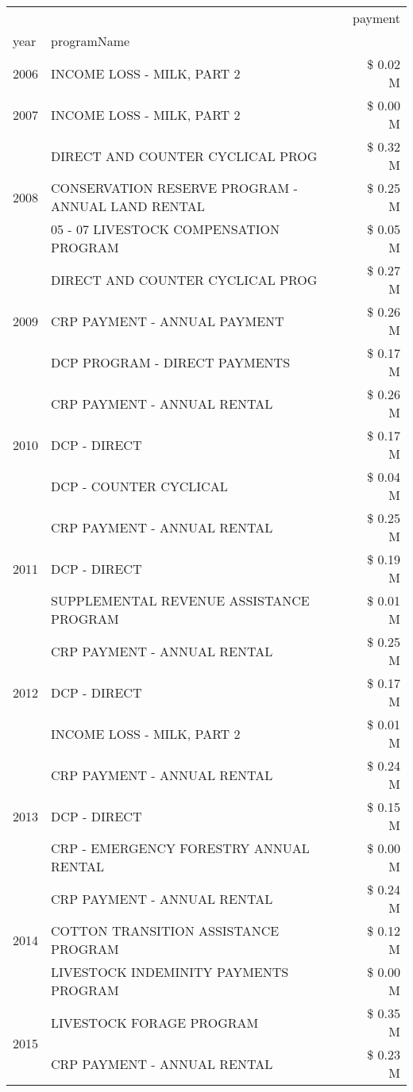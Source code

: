 \begin{tabular}{llr}
\toprule
 &  & payment \\
year & programName &  \\
\midrule
2006 & INCOME LOSS - MILK, PART 2 & \$ 0.02 M \\
\cline{1-3}
2007 & INCOME LOSS - MILK, PART 2 & \$ 0.00 M \\
\cline{1-3}
\multirow[t]{3}{*}{2008} & DIRECT AND COUNTER CYCLICAL PROG & \$ 0.32 M \\
 & CONSERVATION RESERVE PROGRAM - ANNUAL LAND RENTAL & \$ 0.25 M \\
 & 05 - 07 LIVESTOCK COMPENSATION PROGRAM & \$ 0.05 M \\
\cline{1-3}
\multirow[t]{3}{*}{2009} & DIRECT AND COUNTER CYCLICAL PROG & \$ 0.27 M \\
 & CRP PAYMENT - ANNUAL PAYMENT & \$ 0.26 M \\
 & DCP PROGRAM - DIRECT PAYMENTS & \$ 0.17 M \\
\cline{1-3}
\multirow[t]{3}{*}{2010} & CRP PAYMENT - ANNUAL RENTAL & \$ 0.26 M \\
 & DCP - DIRECT & \$ 0.17 M \\
 & DCP - COUNTER CYCLICAL & \$ 0.04 M \\
\cline{1-3}
\multirow[t]{3}{*}{2011} & CRP PAYMENT - ANNUAL RENTAL & \$ 0.25 M \\
 & DCP - DIRECT & \$ 0.19 M \\
 & SUPPLEMENTAL REVENUE ASSISTANCE PROGRAM & \$ 0.01 M \\
\cline{1-3}
\multirow[t]{3}{*}{2012} & CRP PAYMENT - ANNUAL RENTAL & \$ 0.25 M \\
 & DCP - DIRECT & \$ 0.17 M \\
 & INCOME LOSS - MILK, PART 2 & \$ 0.01 M \\
\cline{1-3}
\multirow[t]{3}{*}{2013} & CRP PAYMENT - ANNUAL RENTAL & \$ 0.24 M \\
 & DCP - DIRECT & \$ 0.15 M \\
 & CRP - EMERGENCY FORESTRY ANNUAL RENTAL & \$ 0.00 M \\
\cline{1-3}
\multirow[t]{3}{*}{2014} & CRP PAYMENT - ANNUAL RENTAL & \$ 0.24 M \\
 & COTTON TRANSITION ASSISTANCE PROGRAM & \$ 0.12 M \\
 & LIVESTOCK INDEMINITY PAYMENTS PROGRAM & \$ 0.00 M \\
\cline{1-3}
\multirow[t]{3}{*}{2015} & LIVESTOCK FORAGE PROGRAM & \$ 0.35 M \\
 & CRP PAYMENT - ANNUAL RENTAL & \$ 0.23 M \\

\end{tabular}
